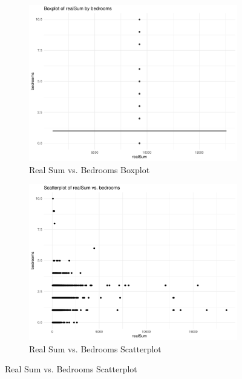 \documentclass[12pt, letterpaper]{article}
\begin{document}
\begin{figure}[H]
  \begin{subfigure}{0.45\textwidth}
    \includegraphics[width=\linewidth]{realSum_bedrooms__boxplot.pdf}
    \caption{Real Sum vs. Bedrooms Boxplot}
    \label{fig:realSum_bedrooms__boxplot}
  \end{subfigure}
  \hspace{0.05\textwidth}
  \begin{subfigure}{0.45\textwidth}
    \includegraphics[width=\linewidth]{realSum_bedrooms__scatterplot.pdf}
    \caption{Real Sum vs. Bedrooms Scatterplot}
    \label{fig:realSum_bedrooms__scatterplot}
  \end{subfigure}


\end{figure}
\end{document}
